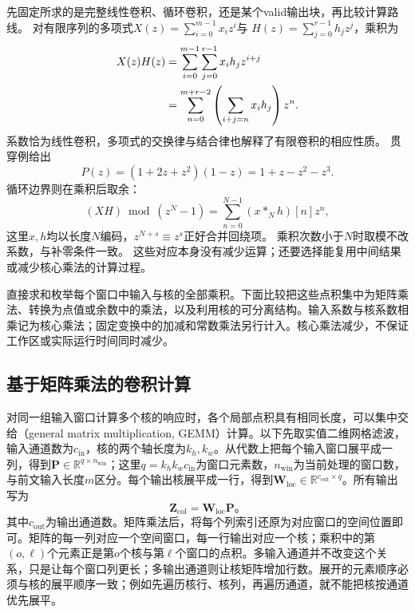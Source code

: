 先固定所求的是完整线性卷积、循环卷积，还是某个valid输出块，再比较计算路线。
对有限序列的多项式$X(z)=\sum_{i=0}^{m-1}x_i z^i$与
$H(z)=\sum_{j=0}^{r-1}h_jz^j$，乘积为
\begin{align}
  X(z)H(z)
  &=\sum_{i=0}^{m-1}\sum_{j=0}^{r-1}x_i h_jz^{i+j}\notag\\
  &=\sum_{n=0}^{m+r-2}\left(\sum_{i+j=n}x_i h_j\right)z^n.
  \label{eq:signal-analysis-polynomial-convolution}
\end{align}
系数恰为线性卷积，多项式的交换律与结合律也解释了有限卷积的相应性质。
贯穿例给出
\begin{equation}
  P(z)=(1+2z+z^2)(1-z)=1+z-z^2-z^3.
  \label{eq:signal-analysis-running-polynomial-product}
\end{equation}
循环边界则在乘积后取余：
\begin{equation}
  (XH)\bmod(z^N-1)=\sum_{n=0}^{N-1}(x*_Nh)[n]z^n,
  \label{eq:signal-analysis-polynomial-circular-convolution}
\end{equation}
这里$x,h$均以长度$N$编码，$z^{N+s}\equiv z^s$正好合并回绕项。
乘积次数小于$N$时取模不改系数，与补零条件一致。
这些对应本身没有减少运算；还要选择能复用中间结果或减少核心乘法的计算过程。

直接求和枚举每个窗口中输入与核的全部乘积。下面比较把这些点积集中为矩阵乘法、转换为点值或余数中的乘法，以及利用核的可分离结构。输入系数与核系数相乘记为核心乘法；固定变换中的加减和常数乘法另行计入。核心乘法减少，不保证工作区或实际运行时间同时减少。

\subsection{基于矩阵乘法的卷积计算}\label{sec:signal-analysis-fast-matrix}
\label{sec:cnn-matrix-algorithm}

对同一组输入窗口计算多个核的响应时，各个局部点积具有相同长度，可以集中交给（general matrix multiplication, GEMM）计算。以下先取实值二维网格滤波，输入通道数为$c_{\mathrm{in}}$，核的两个轴长度为$k_h,k_w$。从代数上把每个输入窗口展平成一列，得到$\bm P\in\mathbb R^{q\times n_{\mathrm{win}}}$；这里$q=k_hk_wc_{\mathrm{in}}$为窗口元素数，$n_{\mathrm{win}}$为当前处理的窗口数，与前文输入长度$m$区分。每个输出核展平成一行，得到$\bm W_{\mathrm{loc}}\in\mathbb R^{c_{\mathrm{out}}\times q}$。所有输出写为
\begin{equation}
  \bm Z_{\mathrm{col}}=\bm W_{\mathrm{loc}}\bm P\text{。}
  \label{eq:signal-analysis-window-matrix-product}
\end{equation}
其中$c_{\mathrm{out}}$为输出通道数。矩阵乘法后，将每个列索引还原为对应窗口的空间位置即可。矩阵的每一列对应一个空间窗口，每一行输出对应一个核；乘积中的第$(o,\ell)$个元素正是第$o$个核与第$\ell$个窗口的点积。多输入通道并不改变这个关系，只是让每个窗口列更长；多输出通道则让核矩阵增加行数。展开的元素顺序必须与核的展平顺序一致；例如先遍历核行、核列，再遍历通道，就不能把核按通道优先展平。

